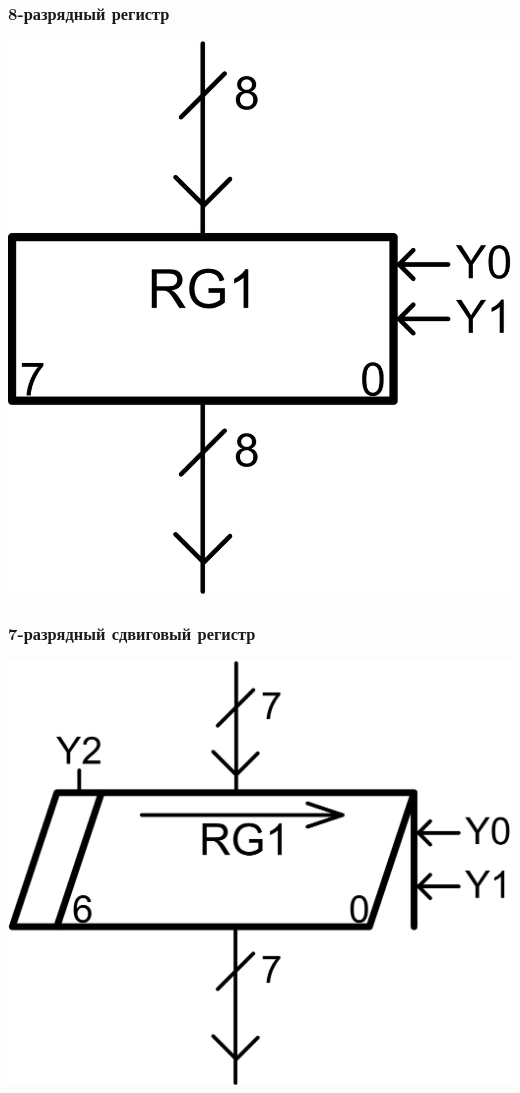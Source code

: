 \begin{frame}
    \frametitle{8-разрядный регистр}
    \begin{center}
        \includegraphics{fig/register}
    \end{center}
\end{frame}

\begin{frame}
    \frametitle{7-разрядный сдвиговый регистр}
    \begin{center}
        \includegraphics{fig/shiftregister}
    \end{center}
\end{frame}


